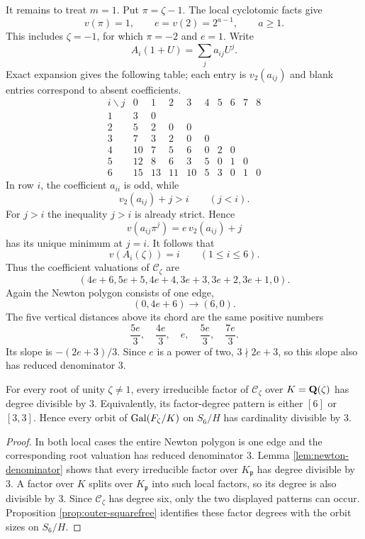 It remains to treat $m=1$.  Put $\pi=\zeta-1$.  The local cyclotomic
facts give
\[
 v(\pi)=1,\qquad e=v(2)=2^{a-1},\qquad a\ge1.
\]
This includes $\zeta=-1$, for which $\pi=-2$ and $e=1$.
Write
\[
 A_i(1+U)=\sum_j a_{ij}U^j.
\]
Exact expansion gives the following table; each entry is
$v_2(a_{ij})$ and blank entries correspond to absent coefficients.
\begin{equation}
\label{eq:outer-taylor-table}
\begin{array}{c|rrrrrrrrr}
i\backslash j&0&1&2&3&4&5&6&7&8\\ \hline
1&3&0\\
2&5&2&0&0\\
3&7&3&2&0&0\\
4&10&7&5&6&0&2&0\\
5&12&8&6&3&5&0&1&0\\
6&15&13&11&10&5&3&0&1&0
\end{array}
\end{equation}
In row $i$, the coefficient $a_{ii}$ is odd, while
\[
 v_2(a_{ij})+j>i\qquad(j<i).
\]
For $j>i$ the inequality $j>i$ is already strict.  Hence
\[
 v(a_{ij}\pi^j)=e\,v_2(a_{ij})+j
\]
has its unique minimum at $j=i$.  It follows that
\begin{equation}
 v(A_i(\zeta))=i\qquad(1\le i\le6).
 \label{eq:outer-pure-A-valuations}
\end{equation}
Thus the coefficient valuations of $\mathcal C_\zeta$ are
\begin{equation}
 (4e+6,5e+5,4e+4,3e+3,3e+2,3e+1,0).
 \label{eq:outer-pure-valuations}
\end{equation}
Again the Newton polygon consists of one edge,
\[
 (0,4e+6)\longrightarrow(6,0).
\]
The five vertical distances above its chord are the same positive
numbers
\[
 \frac{5e}{3},\quad\frac{4e}{3},\quad e,
 \quad\frac{5e}{3},\quad\frac{7e}{3}.
\]
Its slope is $-(2e+3)/3$.  Since $e$ is a power of two,
$3\nmid 2e+3$, so this slope also has reduced denominator $3$.

\begin{proposition}
\label{prop:outer-orbit-divisibility}
For every root of unity $\zeta\ne1$, every irreducible factor of
$\mathcal C_\zeta$ over $K=\mathbf Q(\zeta)$ has degree divisible by $3$.
Equivalently, its factor-degree pattern is either $[6]$ or $[3,3]$.
Hence every orbit of $\operatorname{Gal}(F_\zeta/K)$ on $S_6/H$ has cardinality
divisible by $3$.
\end{proposition}

\begin{proof}
In both local cases the entire Newton polygon is one edge and the
corresponding root valuation has reduced denominator $3$.  Lemma
\ref{lem:newton-denominator} shows that every irreducible factor over
$K_{\mathfrak p}$ has degree divisible by $3$.  A factor over $K$
splits over $K_{\mathfrak p}$ into such local factors, so its degree is
also divisible by $3$.  Since $\mathcal C_\zeta$ has degree six, only
the two displayed patterns can occur.  Proposition
\ref{prop:outer-squarefree} identifies these factor degrees with the
orbit sizes on $S_6/H$.
\end{proof}

